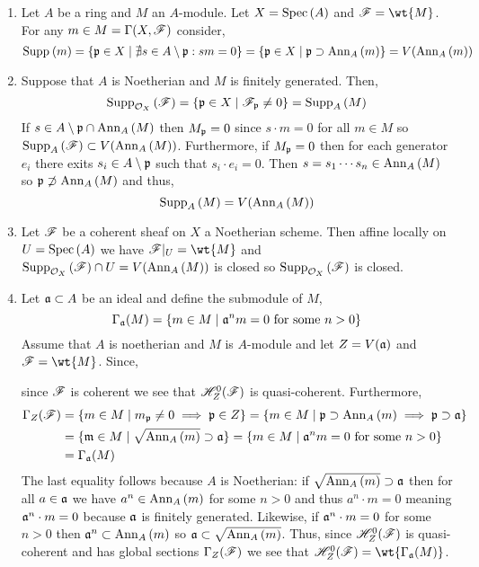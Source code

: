 \documentclass[12pt]{article}
\begin{document}
\begin{enumerate}
\item Let $A$ be a ring and $M$ an $A$-module. Let $X = \mathrm{Spec}\left( A \right)$ and $\F = \wt{M}$. For any $m \in M = \Gamma(X, \mathscr{F})$ consider,
\[ \mathrm{Supp}_{}\left(m \right) = \{ \mathfrak{p} \in X \mid \nexists s \in A \setminus \mathfrak{p} : s m = 0 \} = \{ \mathfrak{p} \in X \mid \mathfrak{p} \supset \mathrm{Ann}_{A}\left(m\right) \} = V(\mathrm{Ann}_{A}\left(m\right)) \]
\item Suppose that $A$ is Noetherian and $M$ is finitely generated. Then,
\[ \mathrm{Supp}_{\mathcal{O}_{X}}\left(\mathscr{F} \right) = \{ \mathfrak{p} \in X \mid \mathscr{F}_{\mathfrak{p}} \neq 0 \} = \mathrm{Supp}_{A}\left(M \right) \]
If $s \in A \setminus \mathfrak{p} \cap \mathrm{Ann}_{A}\left(M\right)$ then $M_{\mathfrak{p}} = 0$ since $s \cdot m = 0$ for all $m \in M$ so $\mathrm{Supp}_{A}\left(\mathscr{F} \right) \subset V(\mathrm{Ann}_{A}\left(M\right))$. Furthermore, if $M_{\mathfrak{p}} = 0$ then for each generator $e_i$ there exits $s_i \in A \setminus \mathfrak{p}$ such that $s_i \cdot e_i = 0$. Then $s = s_1 \cdots s_n \in \mathrm{Ann}_{A}\left(M\right)$ so $\mathfrak{p} \not\supset \mathrm{Ann}_{A}\left(M\right)$ and thus,
\[ \mathrm{Supp}_{A}\left(M \right) = V(\mathrm{Ann}_{A}\left(M\right)) \]
\item Let $\mathscr{F}$ be a coherent sheaf on $X$ a Noetherian scheme. Then affine locally on $U = \mathrm{Spec}\left( A \right)$ we have $\F|_U = \wt{M}$ and $\mathrm{Supp}_{\mathcal{O}_{X}}\left(\mathscr{F} \right) \cap U = V(\mathrm{Ann}_{A}\left(M\right))$ is closed so $\mathrm{Supp}_{\mathcal{O}_{X}}\left(\mathscr{F} \right)$ is closed.
\item Let $\mathfrak{a} \subset A$ be an ideal and define the submodule of $M$,
\[ \Gamma_{\mathfrak{a}}(M) = \{ m \in M \mid \mathfrak{a}^n m = 0 \text{ for some } n > 0 \} \]
Assume that $A$ is noetherian and $M$ is $A$-module and let $Z = V(\mathfrak{a})$ and $\F = \wt{M}$. Since,
\begin{center}
\end{center}
since $\mathscr{F}$ is coherent we see that $\mathscr{H}^0_Z(\mathscr{F})$ is quasi-coherent. Furthermore, 
\begin{align*}
\Gamma_Z(\mathscr{F}) & = \{ m \in M \mid m_{\mathfrak{p}} \neq 0 \implies \mathfrak{p} \in Z \} = \{ m \in M \mid \mathfrak{p} \supset \mathrm{Ann}_{A}\left(m\right) \implies \mathfrak{p} \supset \mathfrak{a} \} 
\\
& = \{ \mathfrak{m} \in M \mid \sqrt{\mathrm{Ann}_{A}\left(m\right)} \supset \mathfrak{a} \} = \{ m \in M \mid \mathfrak{a}^n m = 0 \text{ for some } n > 0 \} 
\\
& = \Gamma_{\mathfrak{a}}(M)
\end{align*}
The last equality follows because $A$ is Noetherian: if $\sqrt{\mathrm{Ann}_{A}\left(m\right)} \supset \mathfrak{a}$ then for all $a \in \mathfrak{a}$ we have $a^n \in \mathrm{Ann}_{A}\left(m\right)$ for some $n > 0$ and thus $a^n \cdot m = 0$ meaning $\mathfrak{a}^n \cdot m = 0$ because $\mathfrak{a}$ is finitely generated. Likewise, if $\mathfrak{a}^n \cdot m = 0$ for some $n > 0$ then $\mathfrak{a}^n \subset \mathrm{Ann}_{A}\left(m\right)$ so $\mathfrak{a} \subset \sqrt{\mathrm{Ann}_{A}\left(m\right)}$. Thus, since $\mathscr{H}^0_Z(\mathscr{F})$ is quasi-coherent and has global sections $\Gamma_Z(\mathscr{F})$ we see that $\H^0_Z(\F) = \wt{\Gamma_{\a}(M)}$.


\end{enumerate}
\end{document}

